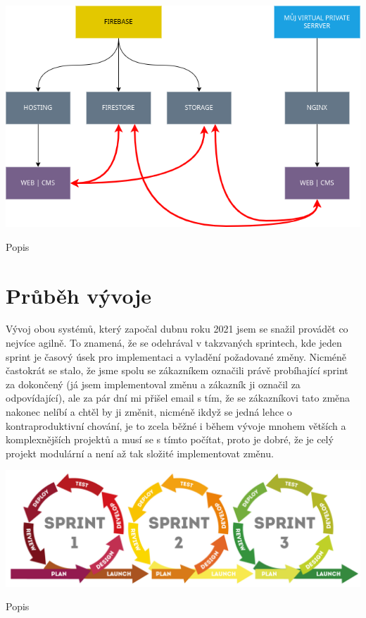 \documentclass[12pt,a4paper]{report}
\begin{document}
  \vspace*{0.5cm}
  \noindent\includegraphics[width=\linewidth]{project_structure.png}
  \begin{center}
    Popis
  \end{center}
  \vspace*{0.5cm}


  \chapter{Průběh vývoje}
  Vývoj obou systémů, který započal dubnu roku 2021 jsem se snažil provádět co nejvíce agilně. To znamená,
  že se odehrával v takzvaných sprintech, kde jeden sprint je časový úsek pro implementaci a vyladění požadované změny.
  Nicméně častokrát se stalo, že jsme spolu se zákazníkem označili právě probíhající sprint za dokončený (já jsem implementoval změnu a zákazník ji označil za odpovídající), ale za pár dní mi 
  přišel email s tím, že se zákazníkovi tato změna nakonec nelíbí a chtěl by ji změnit, nicméně ikdyž se jedná lehce o kontraproduktivní chování, 
  je to zcela běžné i během vývoje mnohem větších a komplexnějších projektů a musí se s tímto počítat, proto je dobré, že je celý projekt modulární a není až tak složité implementovat změnu.
  
  \vspace*{0.5cm}
  \noindent\includegraphics[width=\linewidth]{agile.png}
  \begin{center}
    Popis
  \end{center}
  \vspace*{0.5cm}
 
\end{document}
